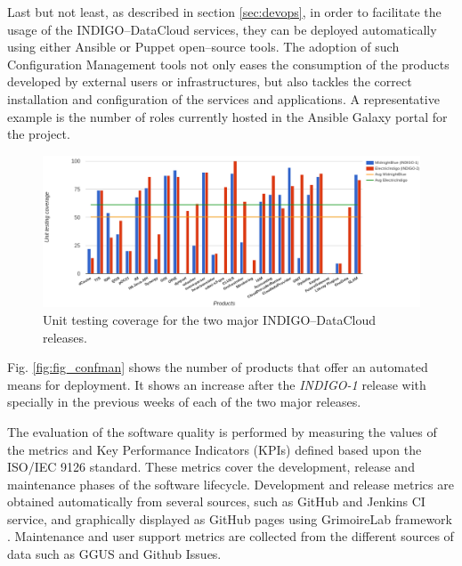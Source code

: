 \documentclass[journal]{IEEEtran}
\begin{document}
Last but not least, as described in section \ref{sec:devops}, in order
to facilitate the usage of the INDIGO--DataCloud services, they can be deployed
automatically using either Ansible \cite{indigo-ansible} or Puppet
\cite{indigo-puppet} open--source tools. The adoption of such Configuration Management
tools not only eases the consumption of the products developed by external users or
infrastructures, but also tackles the correct installation and configuration of the
services and applications. A representative example is the number of roles currently
hosted in the Ansible Galaxy portal for the project.

\begin{figure}
\centering
\includegraphics[width=\textwidth]{images/unittest.png}
\caption{Unit testing coverage for the two major INDIGO--DataCloud releases.}
\label{fig:fig_unittest}
\end{figure}

Fig. \ref{fig:fig_confman} shows the number of products that offer an automated means
for deployment. It shows an increase after the {\sl INDIGO-1} release with specially
in the previous weeks of each of the two major releases.

The evaluation of the software quality is performed by measuring the values of
the metrics and Key Performance Indicators (KPIs) defined based upon the
ISO/IEC 9126 standard. These metrics cover the development, release and
maintenance phases of the software lifecycle. Development and release metrics
are obtained automatically from several sources, such as GitHub and Jenkins CI
service, and graphically displayed as GitHub pages using GrimoireLab framework
\cite{grimoirelab}. Maintenance and user support metrics are collected from the
different sources of data such as GGUS \cite{ggus} and Github Issues.
\end{document}
